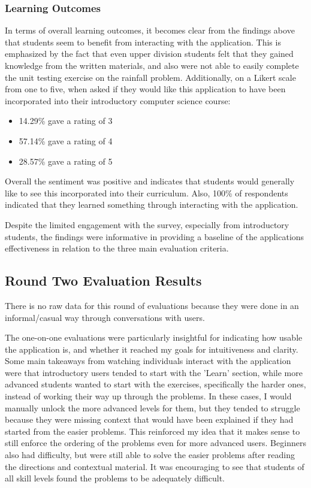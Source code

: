 \documentclass[10pt,twocolumn]{article}
\begin{document}
\subsubsection{Learning Outcomes}

In terms of overall learning outcomes, it becomes clear from the findings above that students seem to benefit from interacting 
with the application. This is emphasized by the fact that even upper division students felt that they gained knowledge from 
the written materials, and also were not able to easily complete the unit testing exercise on the rainfall problem. Additionally,
on a Likert scale from one to five, when asked if they would like this application to have been incorporated into their 
introductory computer science course:

\begin{itemize}
    \item 14.29\% gave a rating of 3
    \item 57.14\% gave a rating of 4
    \item 28.57\% gave a rating of 5
\end{itemize}

Overall the sentiment was positive and indicates that students would generally like to see this incorporated into their 
curriculum. Also, 100\% of respondents indicated that they learned something through interacting 
with the application. 

Despite the limited engagement with the survey, especially from introductory students, the findings were informative in 
providing a baseline of the applications effectiveness in relation to the three main evaluation criteria.

\subsection{Round Two Evaluation Results}

There is no raw data for this round of evaluations because they were done in an informal/casual way through conversations 
with users. 

The one-on-one evaluations were particularly insightful for indicating how usable the application is, and whether it 
reached my goals for intuitiveness and clarity. Some main takeaways from watching individuals interact with the application 
were that introductory users tended to start with the 'Learn' section, while more advanced students wanted to start with the exercises, specifically the harder ones, instead of working their way up through the problems. In these 
cases, I would manually unlock the more advanced levels for them, but they tended to struggle because they were missing 
context that would have been explained if they had started from the easier problems. This reinforced my idea that it makes 
sense to still enforce the ordering of the problems even for more advanced users. Beginners also had difficulty, but 
were still able to solve the easier problems after reading the directions and contextual material. It was encouraging to 
see that students of all skill levels found the problems to be adequately difficult.
\end{document}
